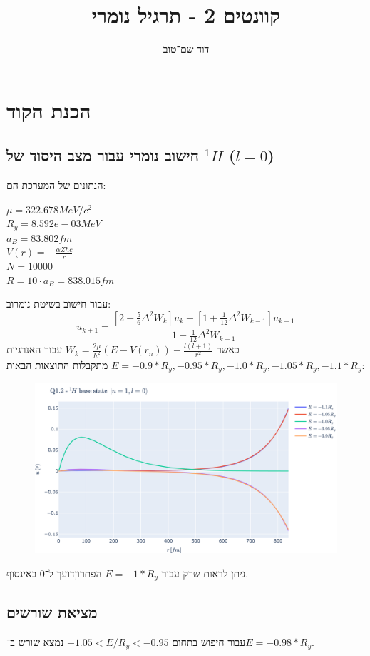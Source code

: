 \documentclass{article}
\title{קוונטים 2 - תרגיל נומרי}
\author{דוד שם־טוב}
\begin{document}
\maketitle

\section{הכנת הקוד}
\subsection{חישוב נומרי עבור מצב היסוד של ${}^{1}\!H$ ($l=0$)}
הנתונים של המערכת הם:
\begin{multicols}{3}
    $\mu = 322.678 MeV / c^2$ \\
    $R_y = 8.592e-03 MeV$ \\
    $a_B = 83.802 fm$ \\
    $V(r) = -\frac{\alpha Z \hbar c}{r}$ \\
    $N = 10000$ \\
    $R = 10\cdot a_B = 838.015 fm$
\end{multicols}
עבור חישוב בשיטת נומרוב:
$$u_{k+1} = \frac{\left[2-\frac{5}{6}\Delta^2W_k\right]u_k-\left[1+\frac{1}{12}\Delta^2W_{k-1}\right]u_{k-1}}{1+\frac{1}{12}\Delta^2W_{k+1}}$$
כאשר $W_k = \frac{2\mu}{\hbar^2}\left(E-V\left(r_n\right)\right) - \frac{l(l+1)}{r^2}$
עבור האנרגיות $ E = -0.9 * R_y, -0.95 * R_y, -1.0 * R_y, -1.05 * R_y, -1.1 * R_y$ מתקבלות התוצאות הבאות:
\begin{figure}\label{fig:1.2}
    \centering
    \includegraphics[width=\linewidth]{plots/1.2.pdf}
\end{figure}
ניתן לראות שרק עבור $E = -1 * R_y$ הפתרוןדועך ל־0 באינסוף.

\subsection{מציאת שורשים}
עבור חיפוש בתחום $-1.05 < E/R_y < -0.95$ נמצא שורש ב־$E = -0.98 * R_y$.
\end{document}
